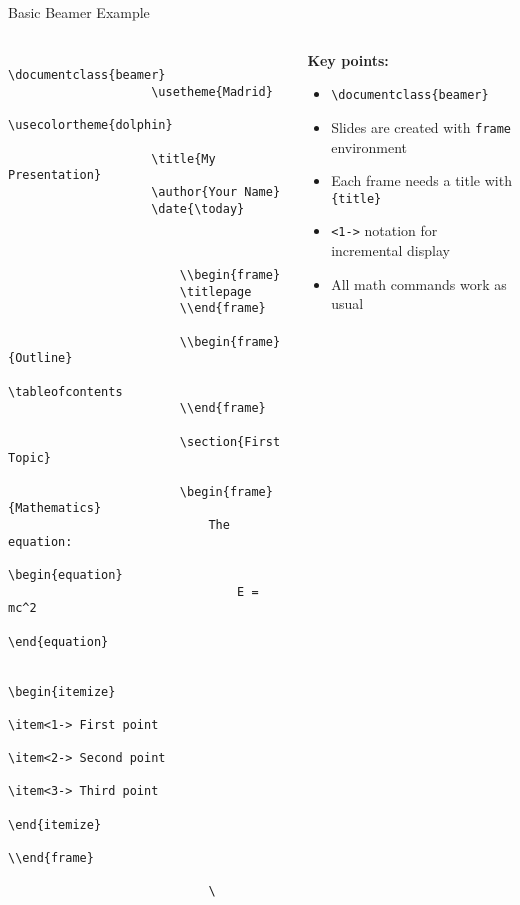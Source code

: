 	\begin{frame}[fragile]{Basic Beamer Example}
		\begin{columns}
			\begin{column}{0.5\textwidth}
				\begin{lstlisting}
					\documentclass{beamer}
					\usetheme{Madrid}
					\usecolortheme{dolphin}
					
					\title{My Presentation}
					\author{Your Name}
					\date{\today}
					
					
						
						\\begin{frame}
						\titlepage
						\\end{frame}
						
						\\begin{frame}{Outline}
						\tableofcontents
						\\end{frame}
						
						\section{First Topic}
						
						\begin{frame}{Mathematics}
							The equation:
							\begin{equation}
								E = mc^2
							\end{equation}
							
							\begin{itemize}
								\item<1-> First point
								\item<2-> Second point
								\item<3-> Third point
							\end{itemize}
							\\end{frame}
							
							\
						\end{lstlisting}
					\end{column}
					
					\begin{column}{0.5\textwidth}
						\textbf{Key points:}
						\begin{itemize}
							\item \texttt{\textbackslash documentclass\{beamer\}}
							\item Slides are created with \texttt{frame} environment
							\item Each frame needs a title with \texttt{\{title\}}
							\item \texttt{<1->} notation for incremental display
							\item All math commands work as usual
						\end{itemize}
						

\end{column}
\end{columns}
\end{frame}
